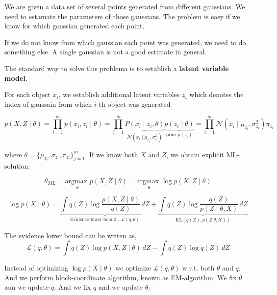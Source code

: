 
We are given a data set of several points generated from different gaussians.
We need to estamate the parameters of those gaussians.
The problem is easy if we know for which gaussian generated each point.

\vspace{0.3cm}

If we do not know from which gaussian each point was generated, we need to do something else.
A single gaussian is not a good estimate in general.

\vspace{0.3cm}

The standard way to solve this problema is to establish a \textbf{latent variable model}.

For each object $x_i$, we establish additional latent variables $z_i$ which denotes the index of gaussain from which $i$-th object was generated

\begin{equation}
 p(X,Z\mid \theta) = \prod_{i=1}^m p(x_i, z_i \mid \theta) = \prod_{i=1}^m \underbrace{P(x_i \mid z_i, \theta)}_{\mathcal{N}(x_i \mid \mu_{z_i},\sigma_{z_i}^2)} \underbrace{p(z_i \mid \theta)}_{\text{prior } p(z_i)} = \prod_{i=1}^m \mathcal{N}(x_i \mid \mu_{z_i},\sigma_{z_i}^2) \pi_{z_i}
\end{equation}

where $\theta = \{\mu_{z_i}, \sigma_{z_i}, \pi_{z_i}\}^m_{j=1}$.
If we know both $X$ and $Z$, we obtain explicit ML-solution:

\begin{equation}
 \theta_{ML} = \underset{\theta}{\text{argmax }} p(X,Z\mid \theta) =\underset{\theta}{\text{argmax }} \log p(X,Z\mid \theta)
\end{equation}

\begin{equation}
 \log p(X \mid \theta) = \underbrace{\int q(Z) \log \frac{p(X, Z \mid \theta)}{q(Z)} \, dZ}_{\text{Evidence lower bound , } \mathcal{L}(q,\theta) } + \underbrace{\int q(Z) \log \frac{q(Z)}{p(Z \mid \theta, X)} \, dZ}_{\text{KL}(q(Z),p(Z|\theta, X))} 
\end{equation}

The evidence lower bound can be writen as,
\begin{equation}
 \mathcal{L}(q,\theta) = \int q(Z) \log p(X, Z \mid \theta)\, dZ - \int q(Z) \log q(Z)\, dZ 
\end{equation}



Instead of optimizing $\log p(X \mid \theta)$ we optimize $\mathcal{L}(q,\theta)$ w.r.t. both $\theta$ and $q$.
And we perform block-coordinate algorithm, known as EM-algorithm.
We fix $\theta$ aun we update $q$.
And we fix $q$ and we update $\theta$.


